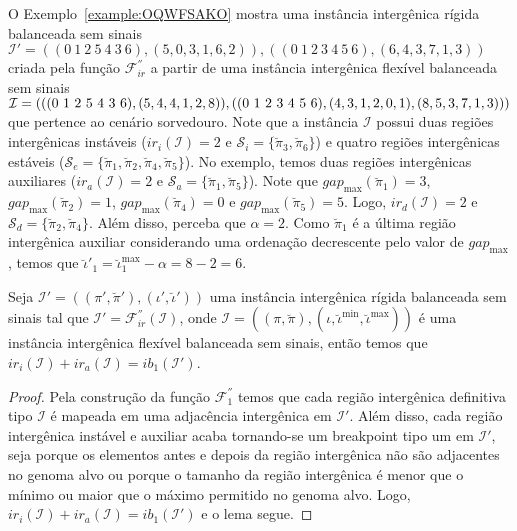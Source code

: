 O Exemplo~\ref{example:OQWFSAKO} mostra uma instância intergênica rígida balanceada sem sinais $\mathcal{I}' = ((0~1~2~5~4~3~6),(5,0,3,1,6,2)),((0~1~2~3~4~5~6),(6,4,3,7,1,3))$ criada pela função $\mathcal{F}_{ir}^{''}$ a partir de uma instância intergênica flexível balanceada sem sinais $\mathcal{I} = (((0~1~2~5~4~3~6),(5,4,4,\break1,2,8)),((0~1~2~3~4~5~6),(4,3,1,2,0,1),(8,5,3,7,1,3)))$ que pertence ao cenário sorvedouro. Note que a instância $\mathcal{I}$ possui duas regiões intergênicas instáveis ($ir_i(\mathcal{I}) = 2$ e $\mathcal{S}_{i}=\{\breve\pi_3,\breve\pi_6\}$) e quatro regiões intergênicas estáveis ($\mathcal{S}_{e}=\{\breve\pi_1,\breve\pi_2,\breve\pi_4,\breve\pi_5\}$). No exemplo, temos duas regiões intergênicas auxiliares ($ir_a(\mathcal{I}) = 2$ e $\mathcal{S}_{a}=\{\breve\pi_1,\breve\pi_5\}$). Note que $gap_{\max}(\breve\pi_1) = 3$, $gap_{\max}(\breve\pi_2) = 1$, $gap_{\max}(\breve\pi_4) = 0$ e $gap_{\max}(\breve\pi_5) = 5$. Logo, $ir_d(\mathcal{I}) = 2$ e $\mathcal{S}_{d}=\{\breve\pi_2,\breve\pi_4\}$. Além disso, perceba que $\alpha = 2$. Como $\breve\pi_1$ é a última região intergênica auxiliar considerando uma ordenação decrescente pelo valor de $gap_{\max}$, temos que $\breve\iota'_1 = \breve\iota^{\max}_1 -\alpha = 8 - 2 = 6$.



\begin{lemma}\label{lemma:KPGCUTDM}
Seja $\mathcal{I'} = ((\pi',\breve\pi'),(\iota',\breve\iota'))$ uma instância intergênica rígida balanceada sem sinais tal que $\mathcal{I'} = \mathcal{F}_{ir}^{''}(\mathcal{I})$, onde $\mathcal{I} = ((\pi,\breve\pi),(\iota,\breve\iota^{\min},\breve\iota^{\max}))$ é uma instância intergênica flexível balanceada sem sinais, então temos que $ir_i(\mathcal{I}) + ir_a(\mathcal{I}) = ib_1(\mathcal{I'})$.
\end{lemma}
\begin{proof}
Pela construção da função $\mathcal{F}_{1}^{''}$ temos que cada região intergênica definitiva tipo $\mathcal{I}$ é mapeada em uma adjacência intergênica em $\mathcal{I'}$. Além disso, cada região intergênica instável e auxiliar acaba tornando-se um breakpoint tipo um em $\mathcal{I'}$, seja porque os elementos antes e depois da região intergênica não são adjacentes no genoma alvo ou porque o tamanho da região intergênica é menor que o mínimo ou maior que o máximo permitido no genoma alvo. Logo, $ir_i(\mathcal{I}) + ir_a(\mathcal{I}) = ib_1(\mathcal{I'})$ e o lema segue.
\end{proof}

